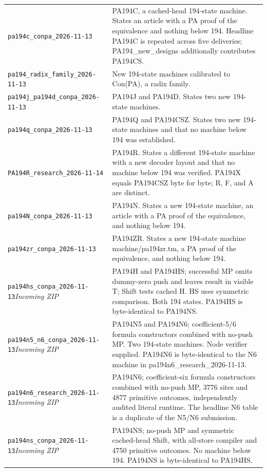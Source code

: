 {\begin{longtable}{p{}p{}}
\nolinkurl{pa194c_conpa_2026-11-13} & PA194C, a cached-head 194-state machine. States an article with a PA proof of the equivalence and nothing below 194. Headline PA194C is repeated across five deliveries; PA194\_new\_designs additionally contributes PA194CS.\\[7pt]
\nolinkurl{pa194_radix_family_2026-11-13} & New 194-state machines calibrated to Con(PA), a radix family.\\[7pt]
\nolinkurl{pa194j_pa194d_conpa_2026-11-13} & PA194J and PA194D. States two new 194-state machines.\\[7pt]
\nolinkurl{pa194q_conpa_2026-11-13} & PA194Q and PA194CSZ. States two new 194-state machines and that no machine below 194 was established.\\[7pt]
\nolinkurl{PA194R_research_2026-11-14} & PA194R. States a different 194-state machine with a new decoder layout and that no machine below 194 was verified. PA194X equals PA194CSZ byte for byte; R, F, and A are distinct.\\[7pt]
\nolinkurl{pa194N_conpa_2026-11-13} & PA194N. States a new 194-state machine, an article with a PA proof of the equivalence, and nothing below 194.\\[7pt]
\nolinkurl{pa194zr_conpa_2026-11-13} & PA194ZR. States a new 194-state machine machine/pa194zr.tm, a PA proof of the equivalence, and nothing below 194.\\[7pt]
\nolinkurl{pa194hs_conpa_2026-11-13}\newline\emph{Incoming ZIP} & PA194H and PA194HS; successful MP omits dummy-zero push and leaves result in visible T; Shift tests cached H. HS uses symmetric comparison. Both 194 states. PA194HS is byte-identical to PA194NS.\\[7pt]
\nolinkurl{pa194n5_n6_conpa_2026-11-13}\newline\emph{Incoming ZIP} & PA194N5 and PA194N6; coefficient-5/6 formula constructors combined with no-push MP. Two 194-state machines. Node verifier supplied. PA194N6 is byte-identical to the N6 machine in pa194n6\_research\_2026-11-13.\\[7pt]
\nolinkurl{pa194n6_research_2026-11-13}\newline\emph{Incoming ZIP} & PA194N6; coefficient-six formula constructors combined with no-push MP, 3776 sites and 4877 primitive outcomes, independently audited literal runtime. The headline N6 table is a duplicate of the N5/N6 submission.\\[7pt]
\nolinkurl{pa194ns_conpa_2026-11-13}\newline\emph{Incoming ZIP} & PA194NS; no-push MP and symmetric cached-head Shift, with all-store compiler and 4750 primitive outcomes. No machine below 194. PA194NS is byte-identical to PA194HS.\\[7pt]
\bottomrule\end{longtable}}
